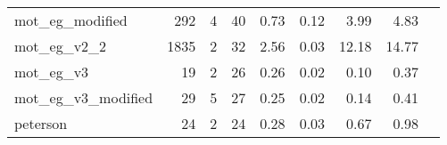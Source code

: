 {\begin{tabular}{l|r|r|r|r|r|r|r|l}
mot\_eg\_modified                           & 292                                                                                               & 4                                                                                                & 40                                                                                                                   & 0.73                            & 0.12                    & {\color[HTML]{00009B} 3.99}    & 4.83                       & \cite{cds}                                              \\
mot\_eg\_v2\_2                              & 1835                                                                                              & 2                                                                                                & 32                                                                                                                   & 2.56                            & 0.03                    & {\color[HTML]{00009B} 12.18}   & 14.77                      & \cite{cds}                                              \\
mot\_eg\_v3                                 & 19                                                                                                & 2                                                                                                & 26                                                                                                                   & 0.26                            & 0.02                    & {\color[HTML]{00009B} 0.10}    & 0.37                       & \cite{cds}                                              \\
mot\_eg\_v3\_modified                       & 29                                                                                                & 5                                                                                                & 27                                                                                                                   & 0.25                            & 0.02                    & {\color[HTML]{00009B} 0.14}    & 0.41                       & \cite{cds}                                              \\
peterson                                    & 24                                                                                                & 2                                                                                                & 24                                                                                                                   & 0.28                            & 0.03                    & {\color[HTML]{00009B} 0.67}    & 0.98                       & \cite{cds}                                              \\

\end{tabular}}
